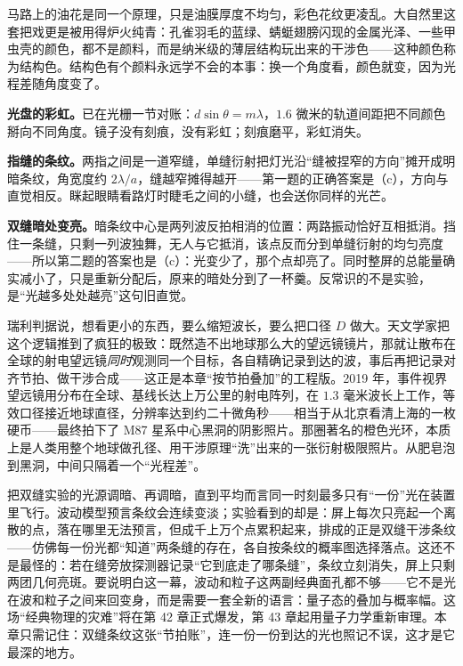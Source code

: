 马路上的油花是同一个原理，只是油膜厚度不均匀，彩色花纹更凌乱。大自然里这套把戏更是被用得炉火纯青：孔雀羽毛的蓝绿、蜻蜓翅膀闪现的金属光泽、一些甲虫壳的颜色，都不是颜料，而是纳米级的薄层结构玩出来的干涉色——这种颜色称为结构色。结构色有个颜料永远学不会的本事：换一个角度看，颜色就变，因为光程差随角度变了。

\textbf{光盘的彩虹。}已在光栅一节对账：\(d\sin\theta=m\lambda\)，\(1.6\) 微米的轨道间距把不同颜色掰向不同角度。镜子没有刻痕，没有彩虹；刻痕磨平，彩虹消失。

\textbf{指缝的条纹。}两指之间是一道窄缝，单缝衍射把灯光沿“缝被捏窄的方向”摊开成明暗条纹，角宽度约 \(2\lambda/a\)，缝越窄摊得越开——第一题的正确答案是（c），方向与直觉相反。眯起眼睛看路灯时睫毛之间的小缝，也会送你同样的光芒。

\textbf{双缝暗处变亮。}暗条纹中心是两列波反拍相消的位置：两路振动恰好互相抵消。挡住一条缝，只剩一列波独舞，无人与它抵消，该点反而分到单缝衍射的均匀亮度——所以第二题的答案也是（c）：光变少了，那个点却亮了。同时整屏的总能量确实减小了，只是重新分配后，原来的暗处分到了一杯羹。反常识的不是实验，是“光越多处处越亮”这句旧直觉。


\begin{thought}[用整个地球当一架望远镜]
瑞利判据说，想看更小的东西，要么缩短波长，要么把口径 \(D\) 做大。天文学家把这个逻辑推到了疯狂的极致：既然造不出地球那么大的望远镜镜片，那就让散布在全球的射电望远镜\emph{同时}观测同一个目标，各自精确记录到达的波，事后再把记录对齐节拍、做干涉合成——这正是本章“按节拍叠加”的工程版。2019 年，事件视界望远镜用分布在全球、基线长达上万公里的射电阵列，在 \(1.3\) 毫米波长上工作，等效口径接近地球直径，分辨率达到约二十微角秒——相当于从北京看清上海的一枚硬币——最终拍下了 M87 星系中心黑洞的阴影照片。那圈著名的橙色光环，本质上是人类用整个地球做孔径、用干涉原理“洗”出来的一张衍射极限照片。从肥皂泡到黑洞，中间只隔着一个“光程差”。
\end{thought}

\begin{thought}[一次只放一个光子]
把双缝实验的光源调暗、再调暗，直到平均而言同一时刻最多只有“一份”光在装置里飞行。波动模型预言条纹会连续变淡；实验看到的却是：屏上每次只亮起一个离散的点，落在哪里无法预言，但成千上万个点累积起来，排成的正是双缝干涉条纹——仿佛每一份光都“知道”两条缝的存在，各自按条纹的概率图选择落点。这还不是最怪的：若在缝旁放探测器记录“它到底走了哪条缝”，条纹立刻消失，屏上只剩两团几何亮斑。要说明白这一幕，波动和粒子这两副经典面孔都不够——它不是光在波和粒子之间来回变身，而是需要一套全新的语言：量子态的叠加与概率幅。这场“经典物理的灾难”将在第 42 章正式爆发，第 43 章起用量子力学重新审理。本章只需记住：双缝条纹这张“节拍账”，连一份一份到达的光也照记不误，这才是它最深的地方。
\end{thought}

